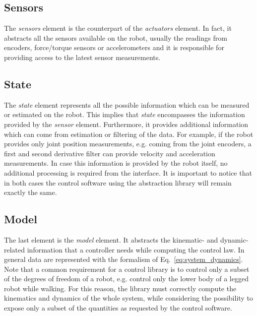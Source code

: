 
\subsection{Sensors} %
\label{sub:sensors}

The \emph{sensors} element is the counterpart of the \emph{actuators} element.
In fact, it abstracts all the sensors available on the robot, usually the readings from encoders, force/torque sensors or accelerometers and it is responsible for providing access to the latest sensor measurements.


\subsection{State} %
\label{sub:state}

The \emph{state} element represents all the possible information which can be measured or estimated on the robot.
This implies that \emph{state} encompasses the information provided by the \emph{sensor} element.
Furthermore, it provides additional information which can come from estimation or filtering of the data.
For example, if the robot provides only joint position measurements, e.g. coming from the joint encoders, a first and second derivative filter can provide velocity and acceleration measurements. 
In case this information is provided by the robot itself, no additional processing is required from the interface.
It is important to notice that in both cases the control software using the abstraction library will remain exactly the same.



\subsection{Model} %
\label{sub:model}

The last element is the \emph{model} element.
It abstracts the kinematic- and dynamic-related information that a controller needs while computing the control law.
In general data are represented with the formalism of Eq.~\eqref{eq:system_dynamics}.
Note that a common requirement for a control library is to control only a subset of the degrees of freedom of a robot, e.g. control only the lower body of a legged robot while walking.
For this reason, the library must correctly compute the kinematics and dynamics of the whole system, while considering the possibility to expose only a subset of the quantities as requested by the control software.


